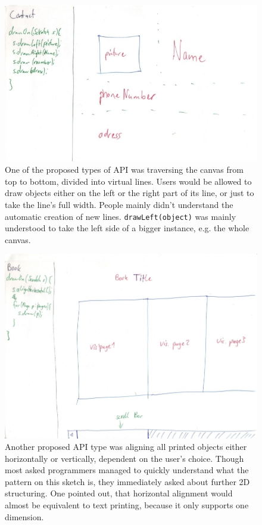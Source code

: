 \documentclass[english]{acm_proc_article-sp}
\begin{document}
\begin{figure}[h]
	\includegraphics[width=\linewidth]{img/sketches/026.jpg}
	\caption[Bad sketch example: Left-right pattern]{One of the proposed types of API was traversing the canvas from top to bottom, divided into virtual lines. Users would be allowed to draw objects either on the left or the right part of its line, or just to take the line's full width. People mainly didn't understand the automatic creation of new lines. \texttt{drawLeft(object)} was mainly understood to take the left side of a bigger instance, e.g. the whole canvas.}
	\label{bad-sketch_left-right}
\end{figure}

\begin{figure}
	\includegraphics[width=\linewidth]{img/sketches/032.jpg}
	\caption[Bad sketch example: Horizontal and vertical alignment]{Another proposed API type was aligning all printed objects either horizontally or vertically, dependent on the user's choice. Though most asked programmers managed to quickly understand what the pattern on this sketch is, they immediately asked about further 2D structuring. One pointed out, that horizontal alignment would almost be equivalent to text printing, because it only supports one dimension.}
	\label{bad-sketch_align-h-v}
\end{figure}
\end{document}
